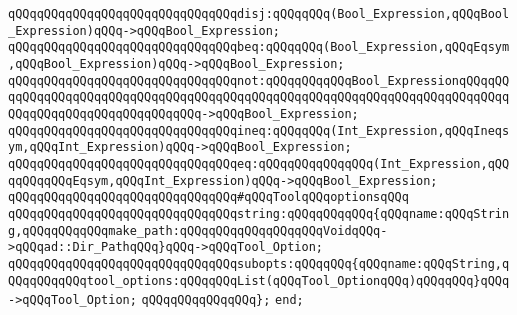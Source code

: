 \verb|qQQqqQQqqQQqqQQqqQQqqQQqqQQqqQQqdisj:qQQqqQQq(Bool_Expression,qQQqBool_Expression)qQQq->qQQqBool_Expression;|\newline
\newline
\verb|qQQqqQQqqQQqqQQqqQQqqQQqqQQqqQQqbeq:qQQqqQQq(Bool_Expression,qQQqEqsym,qQQqBool_Expression)qQQq->qQQqBool_Expression;|\newline
\verb|qQQqqQQqqQQqqQQqqQQqqQQqqQQqqQQqnot:qQQqqQQqqQQqBool_ExpressionqQQqqQQqqQQqqQQqqQQqqQQqqQQqqQQqqQQqqQQqqQQqqQQqqQQqqQQqqQQqqQQqqQQqqQQqqQQqqQQqqQQqqQQqqQQqqQQqqQQqqQQq->qQQqBool_Expression;|\newline
\newline
\verb|qQQqqQQqqQQqqQQqqQQqqQQqqQQqqQQqineq:qQQqqQQq(Int_Expression,qQQqIneqsym,qQQqInt_Expression)qQQq->qQQqBool_Expression;|\newline
\verb|qQQqqQQqqQQqqQQqqQQqqQQqqQQqqQQqeq:qQQqqQQqqQQqqQQq(Int_Expression,qQQqqQQqqQQqEqsym,qQQqInt_Expression)qQQq->qQQqBool_Expression;|\newline
\newline
\verb|qQQqqQQqqQQqqQQqqQQqqQQqqQQqqQQq#qQQqToolqQQqoptionsqQQq|\newline
\verb|qQQqqQQqqQQqqQQqqQQqqQQqqQQqqQQqstring:qQQqqQQqqQQq{qQQqname:qQQqString,qQQqqQQqqQQqmake_path:qQQqqQQqqQQqqQQqqQQqVoidqQQq->qQQqad::Dir_PathqQQq}qQQq->qQQqTool_Option;|\newline
\verb|qQQqqQQqqQQqqQQqqQQqqQQqqQQqqQQqsubopts:qQQqqQQq{qQQqname:qQQqString,qQQqqQQqqQQqtool_options:qQQqqQQqList(qQQqTool_OptionqQQq)qQQqqQQq}qQQq->qQQqTool_Option;|\newline
\verb|qQQqqQQqqQQqqQQq};|\newline
\verb|end;|\newline
\newline

